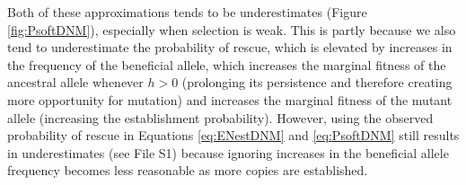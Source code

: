 \documentclass[]{article}
\begin{document}
Both of these approximations tends to be underestimates (Figure \ref{fig:PsoftDNM}), especially when selection is weak.
This is partly because we also tend to underestimate the probability of rescue, which is elevated by increases in the frequency of the beneficial allele, which increases the marginal fitness of the ancestral allele whenever $h>0$ (prolonging its persistence and therefore creating more opportunity for mutation) and increases the marginal fitness of the mutant allele (increasing the establishment probability).
However, using the observed probability of rescue in Equations \ref{eq:ENestDNM} and \ref{eq:PsoftDNM} still results in underestimates (see File S1) because ignoring increases in the beneficial allele frequency becomes less reasonable as more copies are established. 

\end{document}
